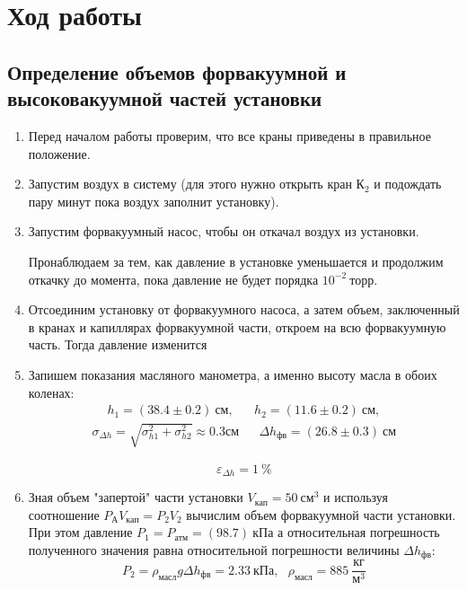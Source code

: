 \documentclass[a4paper,12pt]{article}
\theoremstyle{definition}
\begin{document}
	\section{Ход работы}
	
	\subsection{Определение объемов форвакуумной и высоковакуумной частей установки}
	
	\begin{enumerate}
		
		\item Перед началом работы проверим, что все краны приведены в правильное положение. 
		
		\item Запустим воздух в систему (для этого нужно открыть кран $К_2$  и подождать пару минут пока воздух заполнит установку). 
		
		\item Запустим форвакуумный насос, чтобы он откачал воздух из установки. 
		
		Пронаблюдаем за тем, как давление в установке уменьшается и продолжим откачку до момента, пока давление не будет порядка $ 10^{-2}~торр$.
		
		\item Отсоединим установку от форвакуумного насоса, а затем объем, заключенный в кранах и капиллярах форвакуумной части, откроем на всю форвакуумную часть. Тогда давление изменится
		
		\item Запишем показания масляного манометра, а именно высоту масла в обоих коленах: 
		\begin{align}
			h_1 = (38.4 \pm 0.2) ~см, && h_2 = (11.6 \pm 0.2) ~см,
		\end{align}
		\begin{align}
			\sigma_{\Delta h} = \sqrt{\sigma_{h1}^2 + \sigma_{h2}^2}\approx 0.3 \text{см} & &
			\Delta h_{фв} = (26.8 \pm 0.3) ~см
		\end{align}
		
		\[ \varepsilon_{\Delta h} = 1 \ \% \]
		
		\item Зная объем "запертой"  части установки $V_{кап} = 50 ~см^3$ и используя соотношение $P_\text{А} V_{кап}=P_2 V_2$ вычислим объем форвакуумной части установки. При этом давление $P_1 = P_{атм} = (98.7) ~кПа$ а относительная погрешность полученного значения равна относительной погрешности величины $\Delta h_{фв} $:
		\[P_2 = \rho_{масл} g \Delta h_{фв} = 2.33 \ кПа, \ \ \  \rho_{масл} = 885 \ \frac{кг}{м^3}\]
		

\end{enumerate}
\end{document}
